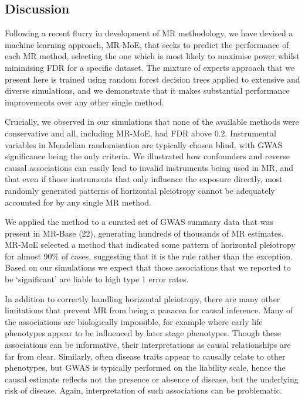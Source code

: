 \documentclass[]{article}
\begin{document}
\subsection{Discussion}\label{discussion}

Following a recent flurry in development of MR methodology, we have
devised a machine learning approach, MR-MoE, that seeks to predict the
performance of each MR method, selecting the one which is most likely to
maximise power whilst minimising FDR for a specific dataset. The mixture
of experts approach that we present here is trained using random forest
decision trees applied to extensive and diverse simulations, and we
demonstrate that it makes substantial performance improvements over any
other single method.

Crucially, we observed in our simulations that none of the available
methods were conservative and all, including MR-MoE, had FDR above 0.2.
Instrumental variables in Mendelian randomisation are typically chosen
blind, with GWAS significance being the only criteria. We illustrated
how confounders and reverse causal associations can easily lead to
invalid instruments being used in MR, and that even if those instruments
that only influence the exposure directly, most randomly generated
patterns of horizontal pleiotropy cannot be adequately accounted for by
any single MR method.

We applied the method to a curated set of GWAS summary data that was
present in MR-Base (22), generating hundreds of thousands of MR
estimates. MR-MoE selected a method that indicated some pattern of
horizontal pleiotropy for almost 90\% of cases, suggesting that it is
the rule rather than the exception. Based on our simulations we expect
that those associations that we reported to be `significant' are liable
to high type 1 error rates.

In addition to correctly handling horizontal pleiotropy, there are many
other limitations that prevent MR from being a panacea for causal
inference. Many of the associations are biologically impossible, for
example where early life phenotypes appear to be influenced by later
stage phenotypes. Though these associations can be informative, their
interpretations as causal relationships are far from clear. Similarly,
often disease traits appear to causally relate to other phenotypes, but
GWAS is typically performed on the liability scale, hence the causal
estimate reflects not the presence or absence of disease, but the
underlying risk of disease. Again, interpretation of such associations
can be problematic.
\end{document}
